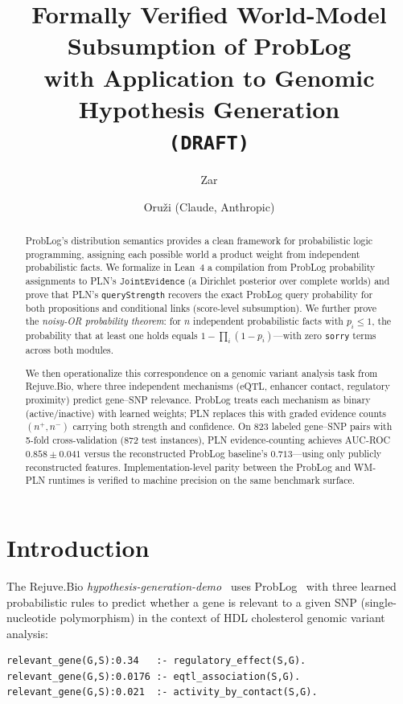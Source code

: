 \documentclass[]{article}
\title{Formally Verified World-Model Subsumption of ProbLog\\
  with Application to Genomic Hypothesis Generation\\[6pt]
  \texttt{(DRAFT)}}
\author{Zar \and Oru\v{z}i (Claude, Anthropic)}
\newcommand{\code}[1]{\texttt{#1}}
\newcommand{\ty}[1]{\ensuremath{\mathtt{#1}}}
\newcommand{\JointEvidence}{\ty{JointEvidence}}
\newcommand{\nplus}{\ensuremath{n^{+}}}
\newcommand{\nminus}{\ensuremath{n^{-}}}
\begin{document}
\maketitle

\begin{abstract}
ProbLog's distribution semantics provides a clean framework for probabilistic
logic programming, assigning each possible world a product weight from independent
probabilistic facts.  We formalize in Lean~4 a compilation from ProbLog probability
assignments to PLN's \JointEvidence{} (a Dirichlet posterior over complete worlds)
and prove that PLN's \code{queryStrength} recovers the exact ProbLog query probability
for both propositions and conditional links (score-level subsumption).
We further prove the
\emph{noisy-OR probability theorem}: for $n$ independent probabilistic facts with
$p_i \le 1$, the probability that at least one holds equals
$1 - \prod_i (1 - p_i)$---with zero \code{sorry} terms across both modules.

We then operationalize this correspondence on a genomic variant analysis task from
Rejuve.Bio, where three independent mechanisms (eQTL, enhancer contact, regulatory
proximity) predict gene--SNP relevance.  ProbLog treats each mechanism as binary
(active/inactive) with learned weights; PLN replaces this with graded evidence
counts $(\nplus, \nminus)$ carrying both strength and confidence.
On 823 labeled gene--SNP pairs with 5-fold cross-validation (872 test instances),
PLN evidence-counting achieves AUC-ROC $0.858 \pm 0.041$ versus the
reconstructed ProbLog baseline's $0.713$---using only publicly reconstructed
features.  Implementation-level parity between the ProbLog and WM-PLN runtimes
is verified to machine precision on the same benchmark surface.
\end{abstract}

\section{Introduction}
\label{sec:intro}

The Rejuve.Bio \emph{hypothesis-generation-demo}~\cite{RejuveBioHypGen2025} uses
ProbLog~\cite{DeRaedt2007ProbLog} with three learned probabilistic rules to predict
whether a gene is relevant to a given SNP (single-nucleotide polymorphism) in the
context of HDL cholesterol genomic variant analysis:

\begin{lstlisting}[caption={ProbLog rules from \code{pl\_rules.pl}},label=lst:problog-rules]
relevant_gene(G,S):0.34   :- regulatory_effect(S,G).
relevant_gene(G,S):0.0176 :- eqtl_association(S,G).
relevant_gene(G,S):0.021  :- activity_by_contact(S,G).
\end{lstlisting}
\end{document}
